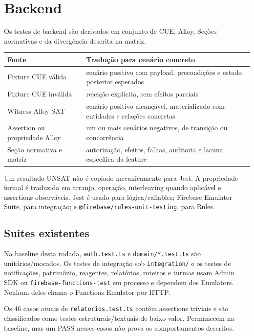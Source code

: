 \section{Backend}

Os testes de backend são derivados em conjunto de CUE, Alloy, Seções normativas
e da divergência descrita na matriz.

\begin{longtable}{p{}p{}}
\toprule
Fonte & Tradução para cenário concreto \\
\midrule
\endhead
Fixture CUE válida & cenário positivo com payload, precondições e estado posterior esperados \\
Fixture CUE inválida & rejeição explícita, sem efeitos parciais \\
Witness Alloy SAT & cenário positivo alcançável, materializado com entidades e relações concretas \\
Assertion ou propriedade Alloy & um ou mais cenários negativos, de transição ou concorrência \\
Seção normativa e matriz & autorização, efeitos, falhas, auditoria e lacuna específica da feature \\
\bottomrule
\end{longtable}

Um resultado UNSAT não é copiado mecanicamente para Jest. A propriedade formal
é traduzida em arranjo, operação, interleaving quando aplicável e assertions
observáveis. Jest é usado para lógica/callables; Firebase Emulator Suite, para
integração; e \texttt{@firebase/rules-unit-testing}, para Rules.

\subsection{Suites existentes}

Na baseline desta rodada, \texttt{auth.test.ts} e \texttt{domain/*.test.ts} são
unitários/mocados. Os testes de integração sob \texttt{integration/} e os testes
de notificações, patrimônio, reagentes, relatórios, roteiros e turmas usam Admin
SDK ou \texttt{firebase-functions-test} em processo e dependem dos Emulators.
Nenhum deles chama o Functions Emulator por HTTP.

Os 46 casos atuais de \texttt{relatorios.test.ts} contêm assertions triviais e
são classificados como testes estruturais/textuais de baixo valor. Permanecem
na baseline, mas um PASS nesses casos não prova os comportamentos descritos.
